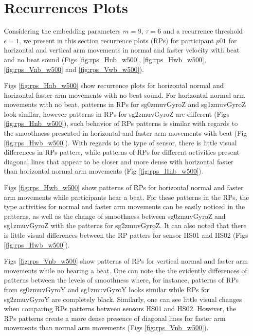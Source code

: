 \section{Recurrences Plots}
Considering the embedding parameters $m=9$, $\tau=6$ and a recurrence 
threshold $\epsilon=1$, we present in this section recurrence plots (RPs) for 
participant $p01$ for horizontal and vertical arm movements in normal 
and faster velocity with beat and no beat sound (Figs \ref{fig:rps_Hnb_w500}, 
\ref{fig:rps_Hwb_w500}, \ref{fig:rps_Vnb_w500} and \ref{fig:rps_Vwb_w500}).


Figs \ref{fig:rps_Hnb_w500} show recurrence plots for horizontal normal
and horizontal faster arm movements with no beat sound. 
For horizontal normal arm movements with no beat, patterns in 
RPs for sg0zmuvGyroZ and sg1zmuvGyroZ look similar, however
patterns in RPs for sg2zmuvGyroZ are different (Figs \ref{fig:rps_Hnb_w500}),
such behavior of RPs patterns is similar with regards to the smoothness 
presented in horizontal and faster arm movements with beat
(Fig \ref{fig:rps_Hwb_w500}).
With regards to the type of sensor, there is little visual differences in 
RPs patters, while patterns of RPs for different activities present diagonal 
lines that appear to be closer and more dense with horizontal faster
than horizontal normal arm movements (Fig \ref{fig:rps_Hnb_w500}).

Figs \ref{fig:rps_Hwb_w500} show patterns of RPs for horizontal normal
and faster arm movements while participants hear a beat. 
For these patterns in the RPs, the type activities for normal and 
faster arm movements can be easily noticed in the patterns,
as well as the change of smoothness between sg0zmuvGyroZ and sg1zmuvGyroZ
with the patterns for sg2zmuvGyroZ. It can also noted that there is 
little visual differences between the RP patters for sensor HS01 and 
HS02 (Figs \ref{fig:rps_Hwb_w500}).

Figs \ref{fig:rps_Vnb_w500} show patterns of RPs for vertical normal
and faster arm movements while no hearing a beat. One can note the 
the evidently differences of patterns between the levels of smoothness 
where, for instance, patterns of RPs from sg0zmuvGyroY and sg1zmuvGyroY 
looks similar while RPs for sg2zmuvGyroY are completely black.
Similarly, one can see little visual changes when comparing RPs patterns 
between sensors HS01 and HS02. 
However, the RPs patterns create a more dense presence of diagonal lines
for faster arm movements than normal arm movements 
(Figs \ref{fig:rps_Vnb_w500}).

